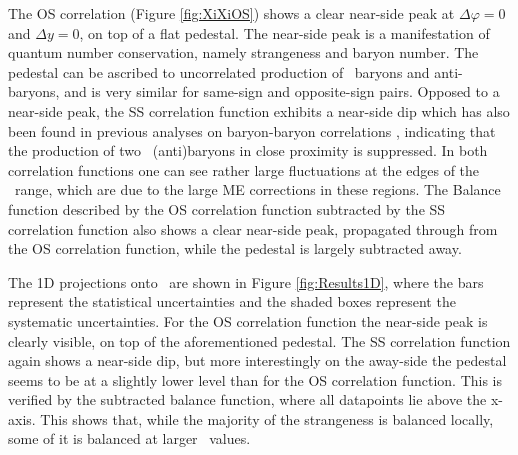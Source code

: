 The OS correlation (Figure \ref{fig:XiXiOS}) shows a clear near-side peak at $\Delta\varphi = 0$ and $\Delta y = 0$, on top of a flat pedestal.  The near-side peak is a manifestation of quantum number conservation, namely strangeness and baryon number. The pedestal can be ascribed to uncorrelated production of \Xi\ baryons and anti-baryons, and is very similar for same-sign and opposite-sign pairs. Opposed to a near-side peak, the SS correlation function exhibits a near-side dip which has also been found in previous analyses on baryon-baryon correlations \cite{ALICE:angcorr}, indicating that the production of two \Xi\ (anti)baryons in close proximity is suppressed. In both correlation functions one can see rather large fluctuations at the edges of the \dy\ range, which are due to the large ME corrections in these regions. The Balance function  described by the OS correlation function subtracted by the SS correlation function also shows a clear near-side peak, propagated through from the OS correlation function, while the pedestal is largely subtracted away.  

The 1D projections onto \dphi\ are shown in Figure \ref{fig:Results1D}, where the bars represent the statistical uncertainties and the shaded boxes represent the systematic uncertainties.  For the OS correlation function the near-side peak is clearly visible, on top of the aforementioned pedestal. The SS correlation function again shows a near-side dip, but more interestingly on the away-side the pedestal seems to be at a slightly lower level than for the OS correlation function. This is verified by the subtracted balance function, where all datapoints lie above the x-axis. This shows that, while the majority of the strangeness  is balanced locally, some of it is balanced at larger \dphi\ values. 

